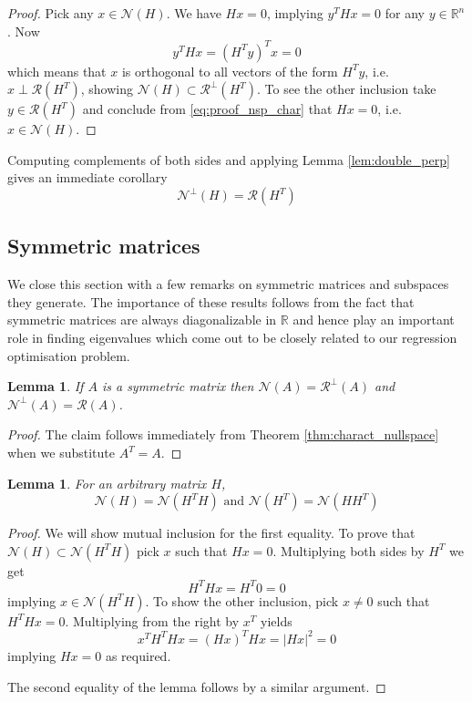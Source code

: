 \documentclass[a4paper,11pt]{article}
\theoremstyle{break}
\newtheorem{lemma}[theorem]{Lemma}
\newcommand{\R}{\mathbb{R}}
\newcommand{\Nu}{\mathcal{N}}
\newcommand{\Ra}{\mathcal{R}}
\begin{document}
\begin{proof}
    Pick any $x \in \Nu(H)$.
    We have $H x = 0$, implying $ y^T H x = 0$ for any $y \in \R^n$. Now
    \begin{equation}\label{eq:proof_nsp_char}
        y^T H x = (H^T y )^T x = 0
    \end{equation}
    which means that $x$ is orthogonal to all vectors of the form $ H^T y $, i.e. $ x \perp \Ra(H^T)$, showing $ \Nu(H) \subset \Ra^\perp(H^T)$. To see the other inclusion take $ y \in \Ra(H^T) $ and conclude from \eqref{eq:proof_nsp_char} that $ H x = 0$, i.e. $ x \in \Nu(H)$.
\end{proof}
Computing complements of both sides and applying Lemma \ref{lem:double_perp} gives an immediate corollary
    $$\Nu^\perp(H) = \Ra(H^T)$$

\subsection{Symmetric matrices}
We close this section with a few remarks on symmetric matrices and subspaces they generate. The importance of these results follows from the fact that symmetric matrices are always diagonalizable in $\R$ and hence play an important role in finding eigenvalues which come out to be closely related to our regression optimisation problem. 

\begin{lemma} \label{lem:charact_sym_nullspace}
    If $A$ is a symmetric matrix then $\Nu(A) = \Ra^\perp(A)$ and $\Nu^\perp(A) = \Ra(A)$.
\end{lemma}
\begin{proof}
    The claim follows immediately from Theorem \ref{thm:charact_nullspace} when we substitute $A^T = A$.
\end{proof}

\begin{lemma}
    \label{lem:nullspaces_hht}
    For an arbitrary matrix $H$,
    $$\Nu(H) = \Nu(H^T H) \text{ and } \Nu(H^T) = \Nu(H H^T)$$
\end{lemma}

\begin{proof}
    We will show mutual inclusion for the first equality. To prove that $\Nu(H) \subset \Nu(H^T H)$ pick $x$ such that $H x = 0$. Multiplying both sides by $H^T$ we get
    $$ H^T H x = H^T 0 = 0 $$
    implying $x \in \Nu(H^T H) $.
    To show the other inclusion, pick $x \neq 0$ such that $H^T H x = 0$. Multiplying from the right by $x^T$ yields
    $$ x^T H^T H x = (H x)^T H x = | H x |^2 = 0 $$
    implying $ H x =0 $ as required.
    
    The second equality of the lemma follows by a similar argument.
\end{proof}
\end{document}
